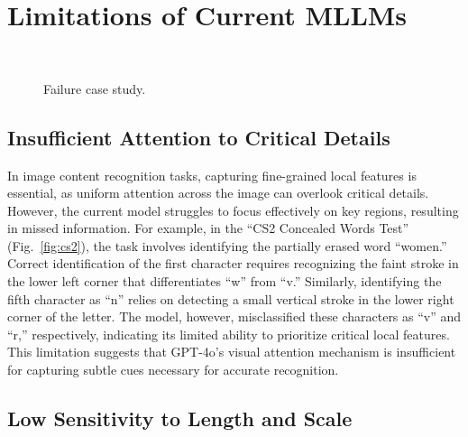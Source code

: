 \section{Limitations of Current MLLMs}

\begin{figure*}[t]
  \centering
   \\
  \caption{Failure case study.}
  \label{fig:questionnaire}
\end{figure*}

\subsection{Insufficient Attention to Critical Details}

In image content recognition tasks, capturing fine-grained local features is essential, as uniform attention across the image can overlook critical details.
However, the current model struggles to focus effectively on key regions, resulting in missed information.
For example, in the ``CS2 Concealed Words Test'' (Fig.~\ref{fig:cs2}), the task involves identifying the partially erased word ``women.''
Correct identification of the first character requires recognizing the faint stroke in the lower left corner that differentiates ``w'' from ``v.''
Similarly, identifying the fifth character as ``n'' relies on detecting a small vertical stroke in the lower right corner of the letter.
The model, however, misclassified these characters as ``v'' and ``r,'' respectively, indicating its limited ability to prioritize critical local features. 
This limitation suggests that GPT-4o's visual attention mechanism is insufficient for capturing subtle cues necessary for accurate recognition.

\subsection{Low Sensitivity to Length and Scale}

